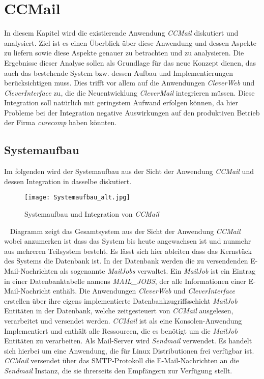 \chapter{CCMail}
\label{cha:ccmail}
In diesem Kapitel wird die existierende Anwendung \emph{CCMail} diskutiert und analysiert. Ziel ist es einen Überblick über diese Anwendung und dessen Aspekte zu liefern sowie diese Aspekte genauer zu betrachten und zu analysieren. Die Ergebnisse dieser Analyse sollen als Grundlage für das neue Konzept dienen, das auch das bestehende System bzw. dessen Aufbau und Implementierungen berücksichtigen muss. Dies trifft vor allem auf die Anwendungen \emph{CleverWeb} und \emph{CleverInterface} zu, die die Neuentwicklung \emph{CleverMail} integrieren müssen. Diese Integration soll natürlich mit geringstem Aufwand erfolgen können, da hier Probleme bei der Integration negative Auswirkungen auf den produktiven Betrieb der Firma \emph{curecomp} haben könnten. 
\section{Systemaufbau}
\label{sec:ccmail-systemaufbau}
Im folgenden wird der Systemaufbau aus der Sicht der Anwendung \emph{CCMail} und dessen Integration in dasselbe diskutiert. 
\begin{figure}[h]
\centering
\texttt{[image: Systemaufbau\_alt.jpg]} %
\caption{Systemaufbau und Integration von \emph{CCMail}}
\label{fig:ccmail-system-und-integration}
\end{figure}
\ \newpage
{} Diagramm zeigt das Gesamtsystem aus der Sicht der Anwendung \emph{CCMail} wobei anzumerken ist dass das System bis heute angewachsen ist und nunmehr aus mehreren Teilsystem besteht. Es lässt sich hier ableiten dass das Kernstück des Systems die Datenbank ist. In der Datenbank werden die zu versendenden E-Mail-Nachrichten als sogenannte \emph{MailJobs} verwaltet. Ein \emph{MailJob} ist ein Eintrag in einer Datenbanktabelle namens \emph{MAIL\_JOBS}, der alle Informationen einer E-Mail-Nachricht enthält.
\newline
\newline
Die Anwendungen \emph{CleverWeb} und \emph{CleverInterface} erstellen über ihre eigens implementierte Datenbankzugriffsschicht \emph{MailJob} Entitäten in der Datenbank, welche zeitgesteuert von \emph{CCMail} ausgelesen, verarbeitet und versendet werden. \emph{CCMail} ist als eine Konsolen-Anwendung Implementiert und enthält alle Ressourcen, die es benötigt um die \emph{MailJob} Entitäten zu verarbeiten.
\newline
\newline
Als Mail-Server wird \emph{Sendmail} verwendet. Es handelt sich hierbei um eine Anwendung, die für Linux Distributionen frei verfügbar ist. \emph{CCMail} versendet über das SMTP-Protokoll die E-Mail-Nachrichten an die \emph{Sendmail} Instanz, die sie ihrerseits den Empfängern zur Verfügung stellt.
\newpage
